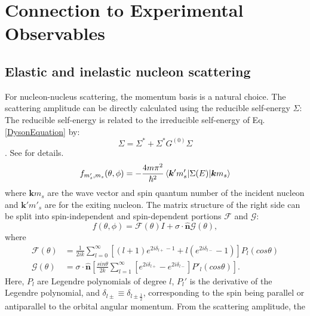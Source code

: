 \section{Connection to Experimental Observables}

\subsection{Elastic and inelastic nucleon scattering} \label{ConnectionToScattering}
For nucleon-nucleus scattering, the momentum basis is a natural choice. The scattering amplitude can be directly calculated using the
reducible self-energy $\Sigma$\footnotemark:
\footnotetext
{
    The reducible self-energy is related to the irreducible
    self-energy of Eq. \ref{DysonEquation} by:
    \begin{equation}
        \Sigma = \Sigma^{*} + \Sigma^{*}G^{(0)}\Sigma
    \end{equation}. See \cite{MahzoonPhDThesis} for details.
}
\begin{equation}
    f_{m'_{s},m_{s}}(\theta,\phi) =
    -\frac{4m\pi^{2}}{\hbar^{2}}\braket{\bm{k}'m'_{s}|\Sigma(E)|\bm{k}m_{s}}
\end{equation}
where $\bm{k}m_{s}$ are the wave vector and spin quantum number of the incident nucleon and
$\bm{k'}m'_{s}$ are for the exiting nucleon. The matrix structure of the right side can be
split into spin-independent and spin-dependent portions $\mathcal{F}$ and $\mathcal{G}$:
\begin{equation}
    f(\theta,\phi) = \mathcal{F}(\theta)I +
    \sigma\cdot\bm{\hat{n}}\mathcal{G}(\theta),
\end{equation}
where
\begin{equation}
    \begin{split}
        \mathcal{F}(\theta) & = \frac{1}{2ik}\sum_{l=0}^{\infty}\left[(l+1)e^{2i\delta_{l+} - 1} +
        l\left(e^{2i\delta_{l-}}-1\right)\right]P_{l}(cos\theta)\\
        \mathcal{G}(\theta) & =
        \sigma\cdot\bm{\hat{n}}\left[\frac{sin\theta}{2k}\sum_{l=1}^{\infty}[e^{2i\delta_{l+}}-e^{2i\delta_{l-}}]P'_{l}(cos\theta)\right].
    \end{split}
\end{equation}
Here, $P_{l}$ are Legendre polynomials of degree $l$, $P_{l}'$ is the derivative of the Legendre
polynomial, and $\delta_{l\pm} \equiv \delta_{l\pm\frac{1}{2}}$, corresponding to the spin being
parallel or antiparallel to the orbital angular momentum. From the scattering amplitude, the 
